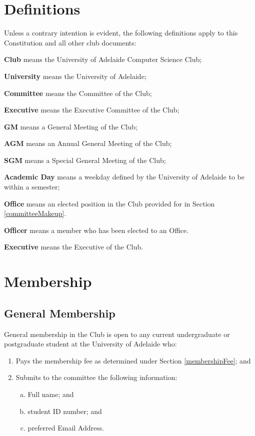 \documentclass[11pt]{article}
\begin{document}
\section{Definitions} \label{definitions}
Unless a contrary intention is evident, the following definitions apply to this Constitution and all other club documents:
\begin{description}
    \item \textbf{Club} means the University of Adelaide Computer Science Club;
    \item \textbf{University} means the University of Adelaide;
    \item \textbf{Committee} means the Committee of the Club;
    \item \textbf{Executive} means the Executive Committee of the Club;
    \item \textbf{GM} means a General Meeting of the Club;
    \item \textbf{AGM} means an Annual General Meeting of the Club;
    \item \textbf{SGM} means a Special General Meeting of the Club;
    \item \textbf{Academic Day} means a weekday defined by the University of Adelaide to be within a semester;
    \item \textbf{Office} means an elected position in the Club provided for in Section \ref{committeeMakeup}.
    \item \textbf{Officer} means a member who has been elected to an Office.
    \item \textbf{Executive} means the Executive of the Club.
    
\end{description}

\section{Membership} \label{membershipClub}

\subsection{General Membership} \label{generalMembership}
General membership in the Club is open to any current undergraduate or postgraduate student at the University of Adelaide who:
\begin{enumerate}
    \item Pays the membership fee as determined under Section \ref{membershipFee}; and
    \item Submits to the committee the following information:
    \begin{enumerate}[(a)]
        \item Full name; and
        \item student ID number; and
        \item preferred Email Address.
    \end{enumerate}
\end{enumerate}
\end{document}
